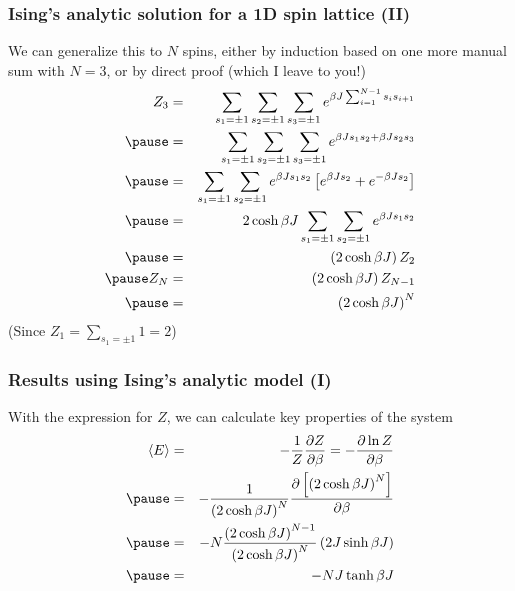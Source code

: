 \documentclass[hyperref={colorlinks=true}]{beamer}
\begin{document}

\begin{frame}%
  \frametitle{Ising's analytic solution for a 1D spin lattice (II)}

    We can generalize this to $N$ spins, either by induction based on one more manual sum with $N=3$, or by direct proof (which I leave to you!)
%
  \begin{eqnarray}
    Z_3 &=& \sum_{s_1 = \pm1} \sum_{s_2 = \pm1} \sum_{s_3 = \pm1} e^{ \beta J\sum_{i=1}^{N-1} s_i s_{i+1} } \\ \pause
        &=& \sum_{s_1 = \pm1} \sum_{s_2 = \pm1} \sum_{s_3 = \pm1} e^{ \beta J s_1 s_2 + \beta J s_2 s_3 } \\ \pause
        &=& \sum_{s_1 = \pm1} \sum_{s_2 = \pm1} e^{ \beta J s_1 s_2} \left[ e^{ \beta J s_2 } + e^{- \beta J s_2 } \right] \\ \pause
        &=& 2 \cosh \beta J \sum_{s_1 = \pm1} \sum_{s_2 = \pm1} e^{ \beta J s_1 s_2}  \\ \pause
        &=& \left(2 \cosh \beta J\right) Z_2 \\ \pause
    Z_N &=& \left(2 \cosh \beta J\right) Z_{N-1} \\ \pause
        &=& \left(2 \cosh \beta J\right)^{N}
  \end{eqnarray}
  (Since $Z_1 = \sum_{s_1 = \pm1} 1 = 2$)
  
\end{frame}


\begin{frame}%
  \frametitle{Results using Ising's analytic model (I)}

    With the expression for $Z$, we can calculate key properties of the system
%
  \begin{eqnarray}
    \mean{E} &=& -\frac{1}{Z}\frac{\partial Z}{\partial\beta} = -\frac{\partial \ln Z}{\partial\beta} \\ \pause
             &=& -\frac{1}{\left(2 \cosh \beta J\right)^{N}}\frac{\partial \left[\left(2 \cosh \beta J\right)^{N}\right]}{\partial\beta} \\ \pause
             &=& -N\frac{\left(2 \cosh \beta J\right)^{N-1}}{\left(2 \cosh \beta J\right)^{N}}\left(2J \sinh \beta J\right) \\ \pause
             &=& -NJ\tanh \beta J 
  \end{eqnarray}
  
\end{frame}
\end{document}

